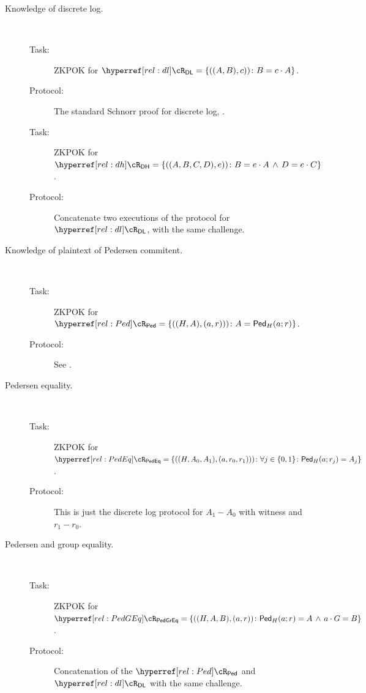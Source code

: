 \begin{description}
	
	\item[Knowledge of discrete log.] ~
	
	\begin{description}
		\item[Task:] ZKPOK for $\rdl = \rdlDef$. \label{rel:dl}
		
		\item[Protocol:] The standard Schnorr proof for discrete log, \eg  \cite{Shoup00b}.
	\end{description}
	
	
	\begin{description}
		\item[Task:] ZKPOK for $\rdh = \rdhDef$. \label{rel:dh}
		
		\item[Protocol:] Concatenate two executions of the protocol for $\rdl$, with  the same challenge.
	\end{description}
	
	
	\item[Knowledge of plaintext of Pedersen commitent.] ~
	
		\begin{description}
		\item[Task:] ZKPOK for $\rPed = \rPedDef$. \label{rel:Ped}
	
	\item[Protocol:]  See \cite[Protocol A.1]{HaitnerLNR23}.
	\end{description}
	
		\item[Pedersen equality.] ~
	
	\begin{description}
		\item[Task:] ZKPOK for $\rPedEq = \rPedEqDef$.
		
		\item[Protocol:]  This is just the discrete log protocol for $A_1-A_0$ with witness and $r_1 - r_0$.
	\end{description}
	
	
		\item[Pedersen and group equality.] ~
	
	\begin{description}
		\item[Task:] ZKPOK for $\rPedGEq = \rPedGEqDef$.
		
		\item[Protocol:]  Concatenation of the $\rPed$ and $\rdl$ with the same challenge.
	\end{description}
	
\end{description}

